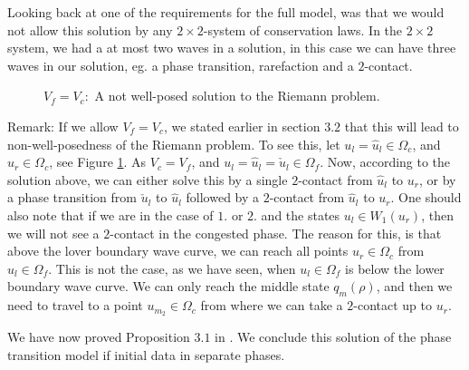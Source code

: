 \documentclass[10pt]{article}
\numberwithin{equation}{section}
\begin{document}
Looking back at one of the requirements for the full model, was that we would not allow this solution by any $2 \times 2$-system of conservation laws. In the $2 \times 2$ system, we had a at most two waves in a solution, in this case we can have three waves in our solution, eg. a phase transition, rarefaction and a $2$-contact. 
\begin{figure}
   
   \caption{$V_f = V_c:$ A not well-posed solution to the Riemann problem.}
   \label{Fig:NotWellPosed}
\end{figure}
Remark: If we allow $V_f = V_c$, we stated earlier in section $3.2$ that this will lead to non-well-posedness of the Riemann problem. To see this, let $u_l = \hat u_l \in \Omega_c$, and $u_r \in \Omega_c$, see Figure \ref{Fig:NotWellPosed}. As $V_c = V_f$, and  $u_l = \hat u_l = \check u_l \in \Omega_f$. Now, according to the solution above, we can either solve this by a single $2$-contact from $\hat u_l$ to $u_r$, or by a phase transition from $\check u_l$ to $\hat u_l$ followed by a $2$-contact from $\hat u_l$ to $u_r$.
One should also note that if we are in the case of $1.$ or $2.$ and the states $u_l \in W_1(u_r)$, then we will not see a $2$-contact in the congested phase. The reason for this, is that above the lover boundary wave curve, we can reach all points $u_r \in \Omega_c$ from $u_l \in \Omega_f$. This is not the case, as we have seen, when $u_l \in \Omega_f$ is below the lower boundary wave curve. We can only reach the middle state $q_m(\rho)$, and then we need to travel to a point $u_{m_2} \in \Omega_c$ from where we can take a $2$-contact up to $u_r$. 

We have now proved Proposition $3.1$ in \cite{Colombo2003}. We conclude this solution of the phase transition model if initial data in separate phases. 
\end{document}
